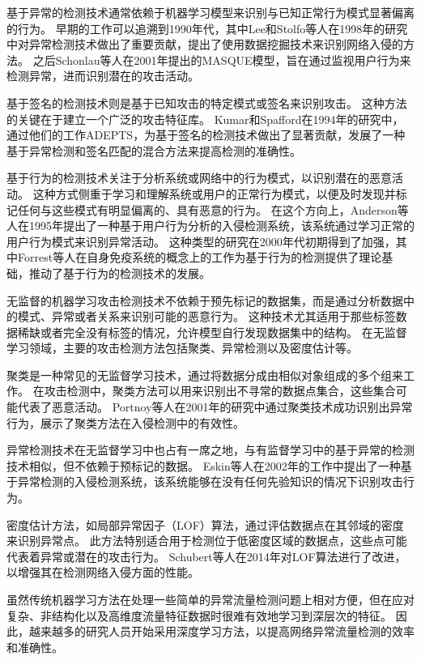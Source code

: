 基于异常的检测技术通常依赖于机器学习模型来识别与已知正常行为模式显著偏离的行为。
早期的工作可以追溯到1990年代，其中Lee和Stolfo等人\cite{lee1998dataMining}在1998年的研究中对异常检测技术做出了重要贡献，提出了使用数据挖掘技术来识别网络入侵的方法。
之后Schonlau等人在2001年提出的MASQUE模型，旨在通过监视用户行为来检测异常，进而识别潜在的攻击活动。

基于签名的检测技术则是基于已知攻击的特定模式或签名来识别攻击。
这种方法的关键在于建立一个广泛的攻击特征库。
Kumar和Spafford\cite{kumar1994adep}在1994年的研究中，通过他们的工作ADEPTS，为基于签名的检测技术做出了显著贡献，发展了一种基于异常检测和签名匹配的混合方法来提高检测的准确性。

基于行为的检测技术关注于分析系统或网络中的行为模式，以识别潜在的恶意活动。
这种方式侧重于学习和理解系统或用户的正常行为模式，以便及时发现并标记任何与这些模式有明显偏离的、具有恶意的行为。
在这个方向上，Anderson等人\cite{anderson1995userBehavior}在1995年提出了一种基于用户行为分析的入侵检测系统，该系统通过学习正常的用户行为模式来识别异常活动。
这种类型的研究在2000年代初期得到了加强，其中Forrest等人\cite{forrest1996selfImmune}在自身免疫系统的概念上的工作为基于行为的检测提供了理论基础，推动了基于行为的检测技术的发展。



无监督的机器学习攻击检测技术不依赖于预先标记的数据集，而是通过分析数据中的模式、异常或者关系来识别可能的恶意行为。
这种技术尤其适用于那些标签数据稀缺或者完全没有标签的情况，允许模型自行发现数据集中的结构。
在无监督学习领域，主要的攻击检测方法包括聚类、异常检测以及密度估计等。

聚类是一种常见的无监督学习技术，通过将数据分成由相似对象组成的多个组来工作。
在攻击检测中，聚类方法可以用来识别出不寻常的数据点集合，这些集合可能代表了恶意活动。
Portnoy等人\cite{portnoy2001clustering}在2001年的研究中通过聚类技术成功识别出异常行为，展示了聚类方法在入侵检测中的有效性。

异常检测技术在无监督学习中也占有一席之地，与有监督学习中的基于异常的检测技术相似，但不依赖于预标记的数据。
Eskin等人\cite{eskin2002anomaly}在2002年的工作中提出了一种基于异常检测的入侵检测系统，该系统能够在没有任何先验知识的情况下识别攻击行为。

密度估计方法，如局部异常因子（LOF）算法，通过评估数据点在其邻域的密度来识别异常点。
此方法特别适合用于检测位于低密度区域的数据点，这些点可能代表着异常或潜在的攻击行为。
Schubert等人\cite{schubert2014local}在2014年对LOF算法进行了改进，以增强其在检测网络入侵方面的性能。

虽然传统机器学习方法在处理一些简单的异常流量检测问题上相对方便，但在应对复杂、非结构化以及高维度流量特征数据时很难有效地学习到深层次的特征。
因此，越来越多的研究人员开始采用深度学习方法，以提高网络异常流量检测的效率和准确性。\par

